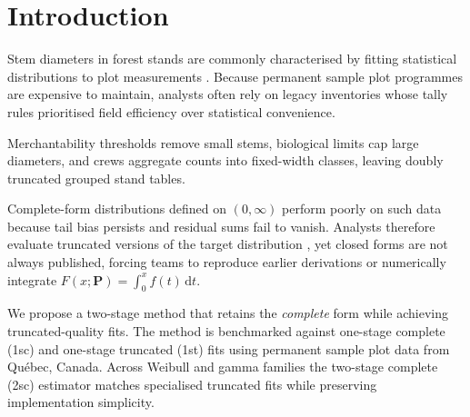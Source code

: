 \section{Introduction}
\label{sec:introduction}

Stem diameters in forest stands are commonly characterised by fitting statistical distributions to plot measurements \citep{bailey1973quantifying, hyink1983generalized}. Because permanent sample plot programmes are expensive to maintain, analysts often rely on legacy inventories whose tally rules prioritised field efficiency over statistical convenience.

Merchantability thresholds remove small stems, biological limits cap large diameters, and crews aggregate counts into fixed-width classes, leaving doubly truncated grouped stand tables.

Complete-form distributions defined on $(0, \infty)$ perform poorly on such data because tail bias persists and residual sums fail to vanish. Analysts therefore evaluate truncated versions of the target distribution \citep{zutter1986characterizing}, yet closed forms are not always published, forcing teams to reproduce earlier derivations \citep{mittal1989estimating, hannon1999estimation, hegde1989estimation, ahmad2001moments, wingo1989left} or numerically integrate $F(x; \boldsymbol{P}) = \int_0^x f(t)\,\mathrm{d}t$.

We propose a two-stage method that retains the \emph{complete} form while achieving truncated-quality fits. The method is benchmarked against one-stage complete (1sc) and one-stage truncated (1st) fits using permanent sample plot data from Qu\'ebec, Canada. Across Weibull and gamma families the two-stage complete (2sc) estimator matches specialised truncated fits while preserving implementation simplicity.
